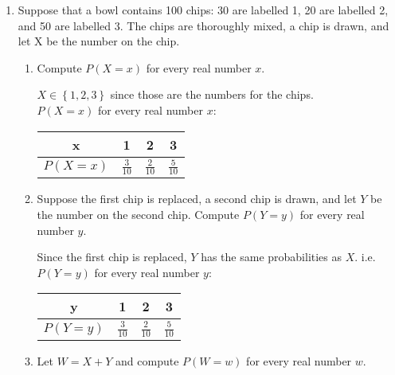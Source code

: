 \documentclass[11pt]{article}
\begin{document}
\begin{enumerate}
	\item Suppose that a bowl contains 100 chips: 30 are labelled 1, 20 are labelled 2, and 50 are labelled 3. The chips are thoroughly mixed, a chip is drawn, and let X be the number on the chip.
		\begin{enumerate}
			\item Compute $ P(X = x) $ for every real number $ x $.
				\begin{mdframed}
					$ X \in \left\lbrace 1, 2, 3 \right\rbrace  $ since those are the numbers for the chips.\\
					$ P(X = x) $ for every real number $ x $:\\[-20pt]
					\begin{center}
						\begin{tabular}{*{4}{| c }|}
							\hline
							x            & 1                & 2                 & 3                \\ \hline
							$ P(X = x) $ & $ \frac{3}{10} $ & $ \frac{2}{10}  $ & $ \frac{5}{10} $ \\ \hline
						\end{tabular}
					\end{center}
				\end{mdframed}
			\item Suppose the first chip is replaced, a second chip is drawn, and let $ Y $ be the number on the second chip. Compute $ P(Y = y) $ for every real number $ y $.
				\begin{mdframed}
					Since the first chip is replaced, $ Y $ has the same probabilities as $ X $. i.e. $ P(Y = y) $ for every real number $ y $:\\[-20pt]
					\begin{center}
						\begin{tabular}{*{4}{| c }|}
							\hline
							y            & 1                & 2                 & 3                \\ \hline
							$ P(Y = y) $ & $ \frac{3}{10} $ & $ \frac{2}{10}  $ & $ \frac{5}{10} $ \\ \hline
						\end{tabular}
					\end{center}
				\end{mdframed}
			\item Let $ W =X+Y $ and compute $ P(W = w) $ for every real number $ w $.
				\begin{mdframed}
					$ W \in \left\lbrace 2, 3, 4, 5, 6 \right\rbrace $\\
					$ P(W = w) = \left\{ \begin{array}{lll}

\end{array}
\end{mdframed}
\end{enumerate}
\end{enumerate}
\end{document}
